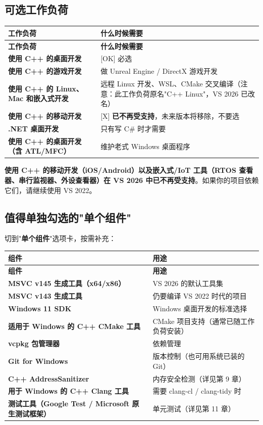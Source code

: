\subsection{可选工作负荷}
\begin{longtable}{L{5.6cm}L{9.4cm}}
\toprule
\textbf{工作负荷} & \textbf{什么时候需要} \\
\midrule
\endfirsthead
\toprule
\textbf{工作负荷} & \textbf{什么时候需要} \\
\midrule
\endhead
\bottomrule
\endlastfoot
\textbf{使用 C++ 的桌面开发} & [OK] 必选 \\
\textbf{使用 C++ 的游戏开发} & 做 Unreal Engine / DirectX 游戏开发 \\
\textbf{使用 C++ 的 Linux、Mac 和嵌入式开发} & 远程 Linux 开发、WSL、CMake 交叉编译（注意：此工作负荷原名"C++ Linux"，VS 2026 已改名） \\
\textbf{使用 C++ 的移动开发} & [X] \textbf{已不再受支持}，未来版本将移除，不要选 \\
\textbf{.NET 桌面开发} & 只有写 C\# 时才需要 \\
\textbf{使用 C++ 的桌面开发（含 ATL/MFC）} & 维护老式 Windows 桌面程序 \\
\end{longtable}

\begin{warnbox}[注意]
\textbf{使用 C++ 的移动开发（iOS/Android）以及嵌入式/IoT 工具（RTOS 查看器、串行监视器、外设查看器）在 VS 2026 中已不再受支持}。如果你的项目依赖它们，请继续使用 VS 2022。
\end{warnbox}

\subsection{值得单独勾选的"单个组件"}
切到"\textbf{单个组件}"选项卡，按需补充：

\begin{longtable}{L{6.0cm}L{9.0cm}}
\toprule
\textbf{组件} & \textbf{用途} \\
\midrule
\endfirsthead
\toprule
\textbf{组件} & \textbf{用途} \\
\midrule
\endhead
\bottomrule
\endlastfoot
\textbf{MSVC v145 生成工具（x64/x86）} & VS 2026 的默认工具集 \\
\textbf{MSVC v143 生成工具} & 仍要编译 VS 2022 时代的项目 \\
\textbf{Windows 11 SDK} & Windows 桌面开发的标准选择 \\
\textbf{适用于 Windows 的 C++ CMake 工具} & CMake 项目支持（通常已随工作负荷安装） \\
\textbf{vcpkg 包管理器} & 依赖管理 \\
\textbf{Git for Windows} & 版本控制（也可用系统已装的 Git） \\
\textbf{C++ AddressSanitizer} & 内存安全检测（详见第 9 章） \\
\textbf{用于 Windows 的 C++ Clang 工具} & 需要 clang-cl / clang-tidy 时 \\
\textbf{测试工具（Google Test / Microsoft 原生测试框架）} & 单元测试（详见第 11 章） \\
\end{longtable}


